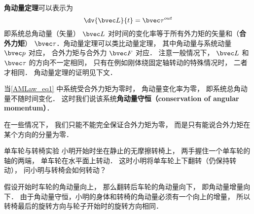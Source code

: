 
\textbf{角动量定理}可以表示为
\begin{equation}\label{AMLaw_eq1}
\dv{\bvec L}{t} = \bvec \tau^{out}
\end{equation}
即系统总角动量（矢量） $\bvec L$ 对时间的变化率等于所有外力矩的矢量和（\textbf{合外力矩}） $\bvec \tau$．角动量定理可以类比动量定理， 其中角动量与系统动量 $\bvec p$ 对应， 合外力矩与合外力 $\bvec F$ 对应． 注意一般情况下， $\bvec L$ 和 $\bvec \tau$ 的方向不一定相同， 只有在例如刚体绕固定轴转动的特殊情况时， 二者才相同． 角动量定理的证明见下文．

当\autoref{AMLaw_eq1} 中系统受合外力矩为零时， 角动量变化率为零， 即系统总角动量不随时间变化． 这时我们说该系统\textbf{角动量守恒（conservation of angular momentum）}．

在一些情况下， 我们只能不能完全保证合外力矩为零， 而是只有能说合外力矩在某个方向的分量为零．

\begin{example}{单车轮与转椅实验}
小明开始时坐在静止的无摩擦转椅上， 两手握住一个单车轮的轴的两端， 单车轮在水平面上转动． 这时小明将单车轮上下翻转（仍保持转动）， 问小明与转椅会如何转动？

假设开始时车轮的角动量向上， 那么翻转后车轮的角动量向下， 即角动量增量向下． 由于角动量守恒，小明的身体和转椅的角动量必须有一个向上的增量， 所以转椅最后的旋转方向与轮子开始时的旋转方向相同．
\end{example}

